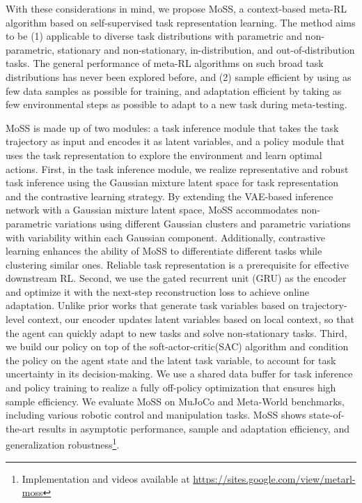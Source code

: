 \documentclass[letterpaper]{article} %
\begin{document}
With these considerations in mind, we propose MoSS, a context-based meta-RL algorithm based on self-supervised task representation learning. The method aims to be (1)  applicable to diverse task distributions with parametric and non-parametric, stationary and non-stationary, in-distribution, and out-of-distribution tasks. The general performance of meta-RL algorithms on such broad task distributions has never been explored before, and (2) sample efficient by using as few data samples as possible for training, and adaptation efficient by taking as few environmental steps as possible to adapt to a new task during meta-testing.

MoSS is made up of two modules: a task inference module that takes the task trajectory as input and encodes it as latent variables, and a policy module that uses the task representation to explore the environment and learn optimal actions. First, in the task inference module, we realize representative and robust task inference using the Gaussian mixture latent space for task representation and the contrastive learning strategy. By extending the VAE-based inference network with a Gaussian mixture latent space, MoSS accommodates non-parametric variations using different Gaussian clusters and parametric variations with variability within each Gaussian component. Additionally, contrastive learning enhances the ability of MoSS to differentiate different tasks while clustering similar ones. Reliable task representation is a prerequisite for effective downstream RL. Second, we use the gated recurrent unit (GRU) \cite{GRU} as the encoder and optimize it with the next-step reconstruction loss to achieve online adaptation. Unlike prior works \cite{PEARL, VariBAD} that generate task variables based on trajectory-level context, our encoder updates latent variables based on local context, so that the agent can quickly adapt to new tasks and solve non-stationary tasks. Third, we build our policy on top of the soft-actor-critic(SAC) algorithm and condition the policy on the agent state and the latent task variable, to account for task uncertainty in its decision-making. We use a shared data buffer for task inference and policy training to realize a fully off-policy optimization that ensures high sample efficiency. We evaluate MoSS on MuJoCo \cite{Mujoco} and Meta-World \cite{MetaWorld} benchmarks, including various robotic control and manipulation tasks. MoSS shows state-of-the-art results in asymptotic performance, sample and adaptation efficiency, and generalization robustness\footnote{Implementation and videos available at \url{https://sites.google.com/view/metarl-moss}}.
\end{document}
